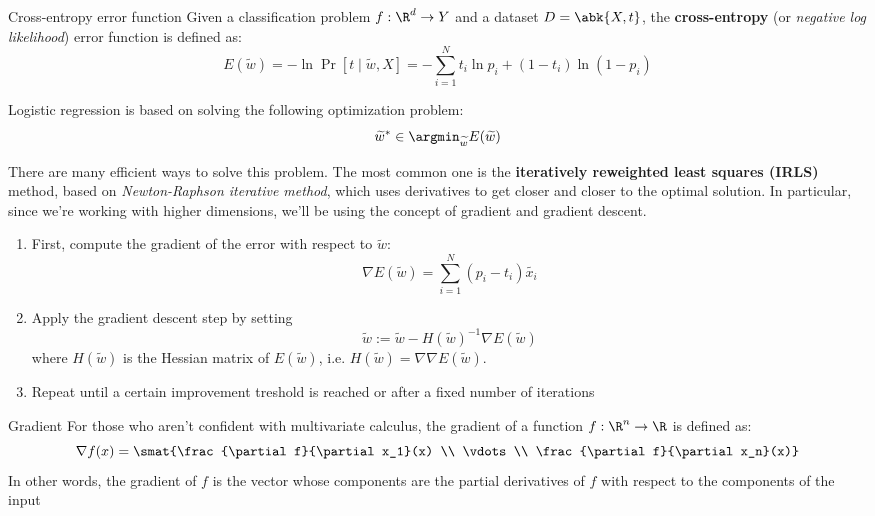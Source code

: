 \documentclass[a4paper, 12pt]{report}
\begin{document}
    \begin{frameddefn}{Cross-entropy error function}
        Given a classification problem $f : \R^d \to Y$ and a dataset $D = \abk{X,t}$, the \textbf{cross-entropy} (or \textit{negative log likelihood}) error function is defined as:
        \[E(\widetilde{w}) = - \ln \Pr[t \mid \widetilde{w}, X] = - \sum_{i = 1}^N t_i \ln p_i + (1-t_i) \ln (1-p_i)\]
    \end{frameddefn}

    Logistic regression is based on solving the following optimization problem:
    \[\widetilde{w}^* \in \argmin_{\widetilde{w}} E(\widetilde{w})\]

    There are many efficient ways to solve this problem. The most common one is the \textbf{iteratively reweighted least squares (IRLS)} method, based on \textit{Newton-Raphson iterative method}, which uses derivatives to get closer and closer to the optimal solution. In particular, since we're working with higher dimensions, we'll be using the concept of gradient and gradient descent.
    
    \begin{enumerate}
        \item First, compute the gradient of the error with respect to $\widetilde{w}$:
        \[\nabla E(\widetilde{w}) = \sum_{i = 1}^N (p_i - t_i) \widetilde{x_i}\]

        \item Apply the gradient descent step by setting
        \[\widetilde{w} := \widetilde{w} - H(\widetilde{w})^{-1} \nabla E(\widetilde{w})\]
        where $H(\widetilde{w})$ is the Hessian matrix of $E(\widetilde{w})$, i.e. $H(\widetilde{w}) = \nabla \nabla E(\widetilde{w})$.

        \item Repeat until a certain improvement treshold is reached or after a fixed number of iterations
    \end{enumerate}

    \begin{framedobs}{Gradient}
        For those who aren't confident with multivariate calculus, the gradient of a function $f : \R^n \to \R$ is defined as:
        \[\nabla f(x) = \smat{\frac{\partial  f}{\partial  x_1}(x) \\ \vdots \\ \frac{\partial  f}{\partial  x_n}(x)}\]
        In other words, the gradient of $f$ is the vector whose components are the partial derivatives of $f$ with respect to the components of the input
    \end{framedobs}
\end{document}
